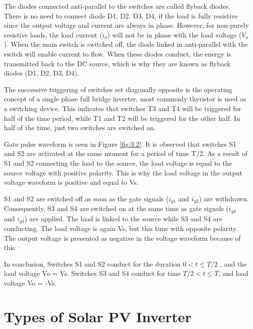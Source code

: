 \documentclass[a4paper,12pt]{iitmdiss}
\begin{document}
The diodes connected anti-parallel to the switches are called flyback diodes. There is no need to connect diode D1, D2, D3, D4, if the load is fully resistive since the output voltage and current are always in phase. However, for non-purely resistive loads, the load current ($i_o$) will not be in phase with the load voltage ($V_o$). When the main switch is switched off, the diode linked in anti-parallel with the switch will enable current to flow. When these diodes conduct, the energy is transmitted back to the DC source, which is why they are known as flyback diodes (D1, D2, D3, D4).

The successive triggering of switches set diagonally opposite is the operating concept of a single phase full bridge inverter, most commonly thyristor is used as a switching device. This indicates that switches T3 and T4 will be triggered for half of the time period, while T1 and T2 will be triggered for the other half. In half of the time, just two switches are switched on.

Gate pulse waveform is seen in Figure \ref{fig:3.2}. It is observed that switches S1 and S2 are activated at the same moment for a period of time T/2. As a result of S1 and S2 connecting the load to the source, the load voltage is equal to the source voltage with positive polarity. This is why the load voltage in the output voltage waveform is positive and equal to Vs.

S1 and S2 are switched off as soon as the gate signals ($i_{g1}$ and $i_{g2}$) are withdrawn. Consequently, S3 and S4 are switched on at the same time as gate signals ($i_{g3}$ and $i_{g4}$) are applied. The load is linked to the source while S3 and S4 are conducting. The load voltage is again Vs, but this time with opposite polarity. The output voltage is presented as negative in the voltage waveform because of this.

In conclusion, Switches S1 and S2 conduct for the duration $0 < t \leq T/2$ , and the load voltage Vo = Vs. Switches S3 and S4 conduct for time $T/2 < t \leq T$, and load voltage Vo = -Vs.

\section{Types of Solar PV Inverter}
\end{document}
